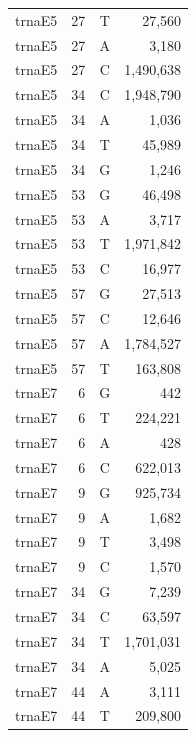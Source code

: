 \documentclass[12pt]{rockefeller}
\begin{document}
\begin{tiny}
\begin{longtable}{|l|r|c|r|}
  trnaE5 &        27 &          T &     27,560 \\
  trnaE5 &        27 &          A &      3,180 \\
  trnaE5 &        27 &          C &  1,490,638 \\
  trnaE5 &        34 &          C &  1,948,790 \\
  trnaE5 &        34 &          A &      1,036 \\
  trnaE5 &        34 &          T &     45,989 \\
  trnaE5 &        34 &          G &      1,246 \\
  trnaE5 &        53 &          G &     46,498 \\
  trnaE5 &        53 &          A &      3,717 \\
  trnaE5 &        53 &          T &  1,971,842 \\
  trnaE5 &        53 &          C &     16,977 \\
  trnaE5 &        57 &          G &     27,513 \\
  trnaE5 &        57 &          C &     12,646 \\
  trnaE5 &        57 &          A &  1,784,527 \\
  trnaE5 &        57 &          T &    163,808 \\
  trnaE7 &         6 &          G &        442 \\
  trnaE7 &         6 &          T &    224,221 \\
  trnaE7 &         6 &          A &        428 \\
  trnaE7 &         6 &          C &    622,013 \\
  trnaE7 &         9 &          G &    925,734 \\
  trnaE7 &         9 &          A &      1,682 \\
  trnaE7 &         9 &          T &      3,498 \\
  trnaE7 &         9 &          C &      1,570 \\
  trnaE7 &        34 &          G &      7,239 \\
  trnaE7 &        34 &          C &     63,597 \\
  trnaE7 &        34 &          T &  1,701,031 \\
  trnaE7 &        34 &          A &      5,025 \\
  trnaE7 &        44 &          A &      3,111 \\
  trnaE7 &        44 &          T &    209,800 \\

\end{longtable}
\end{tiny}
\end{document}
